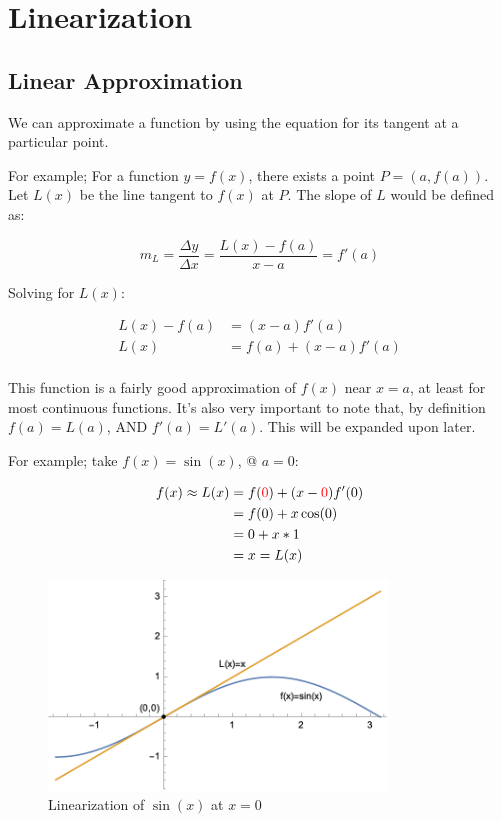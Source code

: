 \documentclass[12pt]{article}
\begin{document}
\section{Linearization}\label{sec:linearization}
\subsection{Linear Approximation}
We can approximate a function by using the equation for its tangent at a particular point.

For example; For a function $y=f(x)$, there exists a point $P = (a, f(a))$. Let $L(x)$ be the line tangent to $f(x)$ at $P$. The slope of $L$ would be defined as:

$$m_L = \frac{\Delta y}{\Delta x} = \frac{L(x) - f(a)}{x - a} = f'(a)$$

Solving for $L(x)$:

\begin{equation}
    \begin{split}
        L(x) - f(a) &= (x-a)f'(a)\\
        L(x) &= f(a) + (x-a)f'(a)\\
    \end{split}
\end{equation}

This function is a fairly good approximation of $f(x)$ near $x=a$, at least for most continuous functions. It's also very important to note that, by definition $f(a) = L(a)$, AND $f'(a) = L'(a)$. This will be expanded upon later.

For example; take $f(x) = \sin(x)$, @ $a=0$:

\begin{equation}
    \begin{split}
        f(x) \approx L(x) &= f(\textcolor{red}{0}) + (x-\textcolor{red}{0})f'(0)\\
        &= f(0) + x\cos(0)\\
        &= 0 + x*1\\
        &= x = L(x)
    \end{split}
\end{equation}

\begin{figure}
    \centering
    \includegraphics[width=9cm]{misc/linearizationofsinx.png}
    \caption{Linearization of $\sin(x)$ at $x=0$}
\end{figure}
\end{document}
